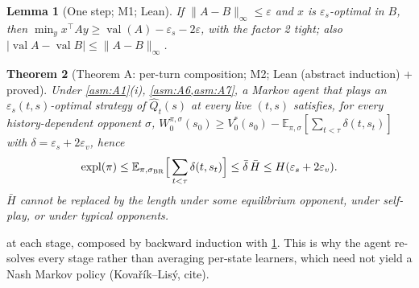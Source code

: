 \documentclass[10pt]{article}
\theoremstyle{plain}
\newtheorem{theorem}{Theorem}
\newtheorem{lemma}[theorem]{Lemma}
\theoremstyle{definition}
\theoremstyle{remark}
\newcommand{\E}{\mathbb{E}}
\DeclareMathOperator{\val}{val}
\DeclareMathOperator{\expl}{expl}
\newcommand{\epss}{\varepsilon_s}
\newcommand{\epsv}{\varepsilon_v}
\newcommand{\Hbar}{\bar H}
\newcommand{\Qhat}{\hat Q}
\begin{document}
\begin{lemma}[One step; M1; Lean]\label{lem:one}
If $\|A-B\|_\infty\le\varepsilon$ and $x$ is $\epss$-optimal in $B$, then $\min_yx^\top Ay\ge\val(A)-\epss-2\varepsilon$,
with the factor 2 tight; also $|\val A-\val B|\le\|A-B\|_\infty$.
\end{lemma}

\begin{theorem}[Theorem A: per-turn composition; M2; Lean (abstract induction) + proved]\label{thm:A}
Under \cref{asm:A1}(i), \cref{asm:A6,asm:A7}, a Markov agent that plays an $\epss(t,s)$-optimal strategy of $\Qhat_t(s)$
at every live $(t,s)$ satisfies, for every history-dependent opponent $\sigma$,
$W^{\pi,\sigma}_0(s_0)\ge V^*_0(s_0)-\E_{\pi,\sigma}[\sum_{t<\tau}\delta(t,s_t)]$ with $\delta=\epss+2\epsv$, hence
\begin{equation}\label{eq:thmA}
\expl(\pi)\le\E_{\pi,\sigma_{\rm BR}}\Big[\sum_{t<\tau}\delta(t,s_t)\Big]\le\bar\delta\,\Hbar\le H(\epss+2\epsv).
\end{equation}
$\Hbar$ cannot be replaced by the length under some equilibrium opponent, under self-play, or under typical opponents.
\end{theorem}
 at each stage, composed by backward induction with \cref{lem:one}. This is why the agent re-solves every
stage rather than averaging per-state learners, which need not yield a Nash Markov policy (Kova\v{r}ík--Lisý, cite).
\end{document}
